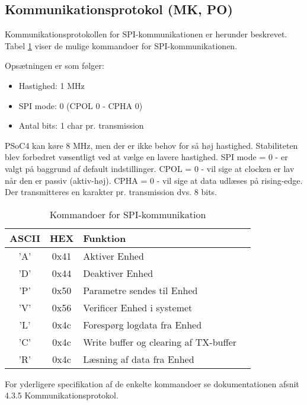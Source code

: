 \subsection{Kommunikationsprotokol (MK, PO)}\label{head:kommunikationsprotokol}
Kommunikationsprotokollen for SPI-kommunikationen er herunder beskrevet. Tabel \ref{tabel:SWProtokol-kommandoer} viser de mulige kommandoer for SPI-kommunikationen. 

Opsætningen er som følger:

\begin{itemize}
  \item Hastighed: 1 MHz
  \item SPI mode: 0 (CPOL 0 - CPHA 0)
  \item Antal bits: 1 char pr. transmission
\end{itemize}

PSoC4 kan køre 8 MHz, men der er ikke behov for så høj hastighed. Stabiliteten blev forbedret væsentligt ved at vælge en lavere hastighed. 
\newline SPI mode = 0 - er valgt på baggrund af default indstillinger. 
\newline CPOL = 0 - vil sige at clocken er lav når den er passiv (aktiv-høj). 
\newline CPHA = 0 - vil sige at data udlæses på rising-edge. 
\newline Der transmitteres en karakter pr. transmission dvs. 8 bits.

\begin{table}[H]
\caption{Kommandoer for SPI-kommunikation}
\centering
\begin{tabular}{|c|c|l|c|}
\hline 
\textbf{ASCII} & \textbf{HEX} & \textbf{Funktion} \\ 
\hline 
'A' & 0x41 & Aktiver Enhed \\ 
\hline 
'D' & 0x44 & Deaktiver Enhed \\ 
\hline 
'P' & 0x50 & Parametre sendes til Enhed \\
\hline 
'V' & 0x56 & Verificer Enhed i systemet \\ 
\hline
'L' & 0x4c & Forespørg logdata fra Enhed \\ 
\hline
'C' & 0x4c & Write buffer og clearing af TX-buffer  \\
\hline
'R' & 0x4c & Læsning af data fra Enhed \\
\hline
\end{tabular}
\label{tabel:SWProtokol-kommandoer}
\end{table} 


For yderligere specifikation af de enkelte kommandoer se dokumentationen afsnit 4.3.5 Kommunikationsprotokol.